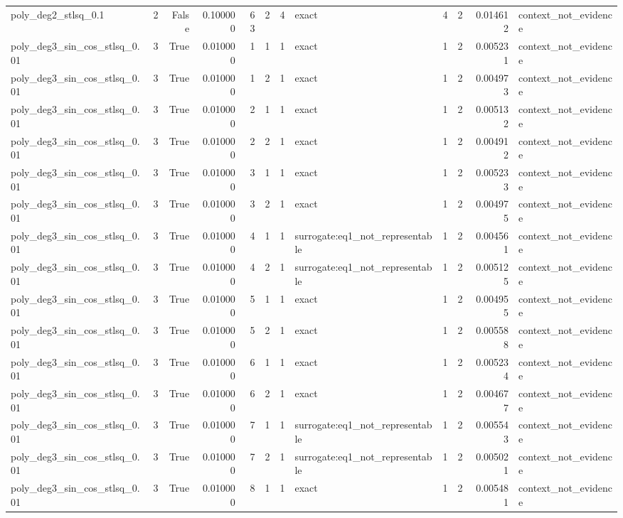 \begin{tabular}{lrrrrrrlrrrl}
poly\_deg2\_stlsq\_0.1 & 2 & False & 0.100000 & 63 & 2 & 4 & exact & 4 & 2 & 0.014612 & context\_not\_evidence \\
poly\_deg3\_sin\_cos\_stlsq\_0.01 & 3 & True & 0.010000 & 1 & 1 & 1 & exact & 1 & 2 & 0.005231 & context\_not\_evidence \\
poly\_deg3\_sin\_cos\_stlsq\_0.01 & 3 & True & 0.010000 & 1 & 2 & 1 & exact & 1 & 2 & 0.004973 & context\_not\_evidence \\
poly\_deg3\_sin\_cos\_stlsq\_0.01 & 3 & True & 0.010000 & 2 & 1 & 1 & exact & 1 & 2 & 0.005132 & context\_not\_evidence \\
poly\_deg3\_sin\_cos\_stlsq\_0.01 & 3 & True & 0.010000 & 2 & 2 & 1 & exact & 1 & 2 & 0.004912 & context\_not\_evidence \\
poly\_deg3\_sin\_cos\_stlsq\_0.01 & 3 & True & 0.010000 & 3 & 1 & 1 & exact & 1 & 2 & 0.005233 & context\_not\_evidence \\
poly\_deg3\_sin\_cos\_stlsq\_0.01 & 3 & True & 0.010000 & 3 & 2 & 1 & exact & 1 & 2 & 0.004975 & context\_not\_evidence \\
poly\_deg3\_sin\_cos\_stlsq\_0.01 & 3 & True & 0.010000 & 4 & 1 & 1 & surrogate:eq1\_not\_representable & 1 & 2 & 0.004561 & context\_not\_evidence \\
poly\_deg3\_sin\_cos\_stlsq\_0.01 & 3 & True & 0.010000 & 4 & 2 & 1 & surrogate:eq1\_not\_representable & 1 & 2 & 0.005125 & context\_not\_evidence \\
poly\_deg3\_sin\_cos\_stlsq\_0.01 & 3 & True & 0.010000 & 5 & 1 & 1 & exact & 1 & 2 & 0.004955 & context\_not\_evidence \\
poly\_deg3\_sin\_cos\_stlsq\_0.01 & 3 & True & 0.010000 & 5 & 2 & 1 & exact & 1 & 2 & 0.005588 & context\_not\_evidence \\
poly\_deg3\_sin\_cos\_stlsq\_0.01 & 3 & True & 0.010000 & 6 & 1 & 1 & exact & 1 & 2 & 0.005234 & context\_not\_evidence \\
poly\_deg3\_sin\_cos\_stlsq\_0.01 & 3 & True & 0.010000 & 6 & 2 & 1 & exact & 1 & 2 & 0.004677 & context\_not\_evidence \\
poly\_deg3\_sin\_cos\_stlsq\_0.01 & 3 & True & 0.010000 & 7 & 1 & 1 & surrogate:eq1\_not\_representable & 1 & 2 & 0.005543 & context\_not\_evidence \\
poly\_deg3\_sin\_cos\_stlsq\_0.01 & 3 & True & 0.010000 & 7 & 2 & 1 & surrogate:eq1\_not\_representable & 1 & 2 & 0.005021 & context\_not\_evidence \\
poly\_deg3\_sin\_cos\_stlsq\_0.01 & 3 & True & 0.010000 & 8 & 1 & 1 & exact & 1 & 2 & 0.005481 & context\_not\_evidence \\

\end{tabular}
